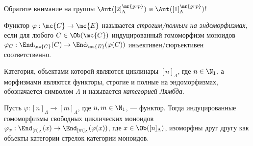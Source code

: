 \documentclass[
	extrafontsizes,
	11pt,
	hyphens,
]{memoir}
\begin{document}
\begin{remark}
Обратите внимание на группы \(\Aut([2]_\Lambda^\mr{grp})\) и \(\Aut([1]_\Lambda^\mr{grp})\)!
\end{remark}



\begin{definition}
Функтор \(\varphi : \mc{C} \to \mc{E}\) называется \emph{стро\-гим/пол\-ным на эндоморфизмах}, если для любого \(C \in \Ob(\mc{C})\) индуцированный гомоморфизм моноидов
\(\varphi_C : \End_\mc{C}(C) \to \End_\mc{E}(\varphi(C))\)
инъективен/сюръективен соответственно.
\end{definition}

\begin{definition}
Категория, объектами которой являются циклинары \([n]_\Lambda\), где \(n \in \N_1\), а морфизмами
являются функторы,
строгие и полные на эндоморфизмах,
обозначается символом \(\Lambda\) и называется \emph{категорией Лямбда}.
\end{definition}

\begin{lemma}%
Пусть \(\varphi : [n]_\Lambda \to [m]_\Lambda\), где \(n, m \in \N_1\), --- функтор.
Тогда индуцированные гомоморфизмы свободных циклических моноидов
\(\varphi_x : \End_{[n]_\Lambda}(x) \to \End_{[m]_\Lambda}(\varphi(x))\),
где \(x \in \Ob([n]_\Lambda)\),
изоморфны друг другу
как объекты категории стрелок категории моноидов.
\end{lemma}
\end{document}
